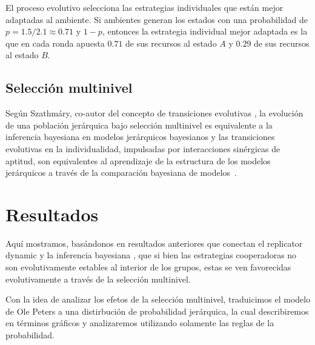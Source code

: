 \documentclass[a4paper,10pt]{article}
\begin{document}
El proceso evolutivo selecciona las estrategias individuales que están mejor adaptadas al ambiente.
Si ambientes generan los estados con una probabilidad de $p=1.5/2.1\approx 0.71$ y $1-p$, entonces la estrategia individual mejor adaptada es la que en cada ronda apuesta $0.71$ de sus recursos al estado $A$ y $0.29$ de sus recursos al estado $B$.

% 
% 

\subsection{Selección multinivel}

Según Szathm\'ary, co-autor del concepto de transiciones evolutivas \cite{szathmary1995-evolutionaryTransitions, szathmary2015-evolutionaryTransitions}, la evolución de una población jerárquica bajo selección multinivel es equivalente a la inferencia bayesiana en modelos jerárquicos bayesianos y las transiciones evolutivas en la individualidad, impulsadas por interacciones sinérgicas de aptitud, son equivalentes al aprendizaje de la estructura de los modelos jerárquicos a través de la comparación bayesiana de modelos~\cite{czegel2019-bayesianEvolution}.


\section{Resultados}

Aquí mostramos, basándonos en resultados anteriores que conectan el replicator dynamic y la inferencia bayesiana \cite{}, que si bien las estrategias cooperadoras no son evolutivamente estables al interior de los grupos, estas se ven favorecidas evolutivamente a través de la selección multinivel.

Con la idea de analizar los efetos de la selección multinivel, traduicimos el modelo de Ole Peters a una distirbución de probabilidad jerárquica, la cual describiremos en términos gráficos y analizaremos utilizando solamente las reglas de la probabilidad.
\end{document}
